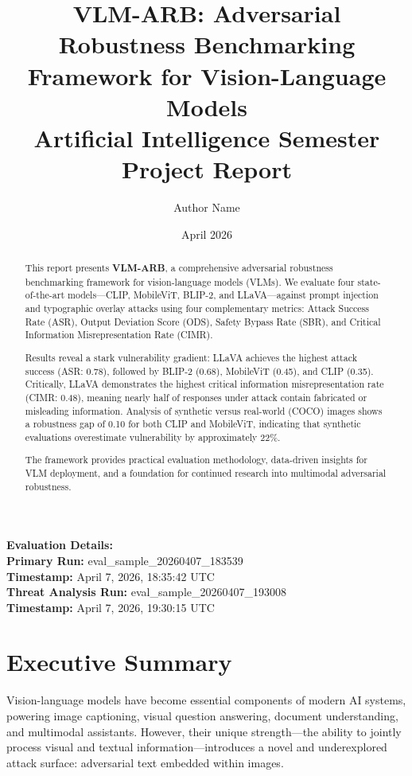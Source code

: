\documentclass[11pt]{article}
\title{VLM-ARB: Adversarial Robustness Benchmarking Framework for Vision-Language Models\\[0.4em]
\large Artificial Intelligence Semester Project Report}
\author{Author Name}
\date{April 2026}
\begin{document}
\maketitle

\vspace{0.4cm}
\begin{flushleft}
\small
\textbf{Evaluation Details:}\\
\textbf{Primary Run:} eval\_sample\_20260407\_183539\\
\textbf{Timestamp:} April 7, 2026, 18:35:42 UTC\\[0.2cm]
\textbf{Threat Analysis Run:} eval\_sample\_20260407\_193008\\
\textbf{Timestamp:} April 7, 2026, 19:30:15 UTC
\end{flushleft}

\begin{abstract}
\noindent This report presents \textbf{VLM-ARB}, a comprehensive adversarial robustness benchmarking framework for vision-language models (VLMs). We evaluate four state-of-the-art models---CLIP, MobileViT, BLIP-2, and LLaVA---against prompt injection and typographic overlay attacks using four complementary metrics: Attack Success Rate (ASR), Output Deviation Score (ODS), Safety Bypass Rate (SBR), and Critical Information Misrepresentation Rate (CIMR). 

Results reveal a stark vulnerability gradient: LLaVA achieves the highest attack success (ASR: 0.78), followed by BLIP-2 (0.68), MobileViT (0.45), and CLIP (0.35). Critically, LLaVA demonstrates the highest critical information misrepresentation rate (CIMR: 0.48), meaning nearly half of responses under attack contain fabricated or misleading information. Analysis of synthetic versus real-world (COCO) images shows a robustness gap of 0.10 for both CLIP and MobileViT, indicating that synthetic evaluations overestimate vulnerability by approximately 22\%.

The framework provides practical evaluation methodology, data-driven insights for VLM deployment, and a foundation for continued research into multimodal adversarial robustness.
\end{abstract}

\newpage
\tableofcontents
\newpage

\section{Executive Summary}

Vision-language models have become essential components of modern AI systems, powering image captioning, visual question answering, document understanding, and multimodal assistants. However, their unique strength---the ability to jointly process visual and textual information---introduces a novel and underexplored attack surface: adversarial text embedded within images.
\end{document}
